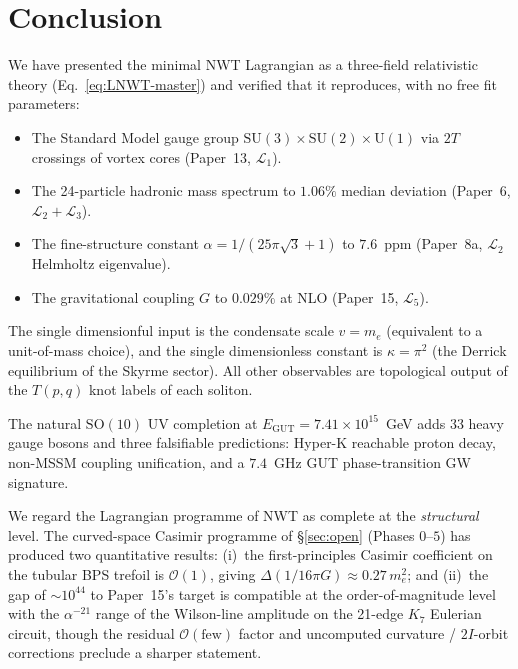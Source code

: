 \documentclass[11pt]{article}
\begin{document}
\section{Conclusion}
\label{sec:conclusion}

We have presented the minimal NWT Lagrangian as a three-field
relativistic theory (Eq.~\ref{eq:LNWT-master}) and verified that
it reproduces, with no free fit parameters:

\begin{itemize}\setlength\itemsep{1pt}
\item The Standard Model gauge group $\mathrm{SU}(3) \times
\mathrm{SU}(2) \times \mathrm{U}(1)$ via $2T$ crossings of vortex
cores (Paper~13, $\mathcal{L}_1$).
\item The 24-particle hadronic mass spectrum to $1.06\%$ median
deviation (Paper~6, $\mathcal{L}_2 + \mathcal{L}_3$).
\item The fine-structure constant $\alpha = 1/(25\pi\sqrt{3} + 1)$
to $7.6$~ppm (Paper~8a, $\mathcal{L}_2$ Helmholtz eigenvalue).
\item The gravitational coupling $G$ to $0.029\%$ at NLO
(Paper~15, $\mathcal{L}_5$).
\end{itemize}

The single dimensionful input is the condensate scale $v = m_e$
(equivalent to a unit-of-mass choice), and the single dimensionless
constant is $\kappa = \pi^2$ (the Derrick equilibrium of the
Skyrme sector).  All other observables are topological output of
the $T(p, q)$ knot labels of each soliton.

The natural $\mathrm{SO}(10)$ UV completion at $E_\text{GUT} =
7.41 \times 10^{15}$~GeV adds 33 heavy gauge bosons and three
falsifiable predictions: Hyper-K reachable proton decay, non-MSSM
coupling unification, and a $7.4$~GHz GUT phase-transition GW
signature.

We regard the Lagrangian programme of NWT as complete at the
\emph{structural} level.  The curved-space Casimir programme of
\S\ref{sec:open} (Phases $0$--$5$) has produced two quantitative
results: (i)~the first-principles Casimir coefficient on the
tubular BPS trefoil is $\mathcal{O}(1)$, giving
$\Delta(1/16\pi G) \approx 0.27\,m_e^2$; and (ii)~the gap of
$\sim 10^{44}$ to Paper~15's target is compatible at the
order-of-magnitude level with the $\alpha^{-21}$ range of the
Wilson-line amplitude on the 21-edge $K_7$ Eulerian circuit,
though the residual $\mathcal{O}(\text{few})$ factor and
uncomputed curvature / $2I$-orbit corrections preclude a sharper
statement.
\end{document}
